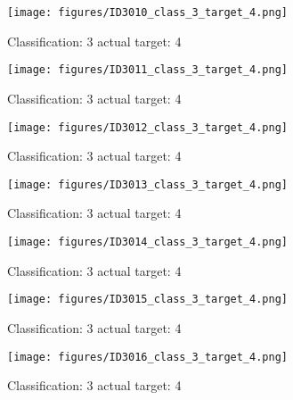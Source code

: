 \begin{figure}[h!]
\begin{center}
\texttt{[image: figures/ID3010\_class\_3\_target\_4.png]}
\end{center}
\caption{ Classification: 3 actual target: 4}
\label{fig:ID3010_class_3_target_4}
\end{figure}
\begin{figure}[h!]
\begin{center}
\texttt{[image: figures/ID3011\_class\_3\_target\_4.png]}
\end{center}
\caption{ Classification: 3 actual target: 4}
\label{fig:ID3011_class_3_target_4}
\end{figure}
\begin{figure}[h!]
\begin{center}
\texttt{[image: figures/ID3012\_class\_3\_target\_4.png]}
\end{center}
\caption{ Classification: 3 actual target: 4}
\label{fig:ID3012_class_3_target_4}
\end{figure}
\begin{figure}[h!]
\begin{center}
\texttt{[image: figures/ID3013\_class\_3\_target\_4.png]}
\end{center}
\caption{ Classification: 3 actual target: 4}
\label{fig:ID3013_class_3_target_4}
\end{figure}
\begin{figure}[h!]
\begin{center}
\texttt{[image: figures/ID3014\_class\_3\_target\_4.png]}
\end{center}
\caption{ Classification: 3 actual target: 4}
\label{fig:ID3014_class_3_target_4}
\end{figure}
\begin{figure}[h!]
\begin{center}
\texttt{[image: figures/ID3015\_class\_3\_target\_4.png]}
\end{center}
\caption{ Classification: 3 actual target: 4}
\label{fig:ID3015_class_3_target_4}
\end{figure}
\begin{figure}[h!]
\begin{center}
\texttt{[image: figures/ID3016\_class\_3\_target\_4.png]}
\end{center}
\caption{ Classification: 3 actual target: 4}
\label{fig:ID3016_class_3_target_4}
\end{figure}
